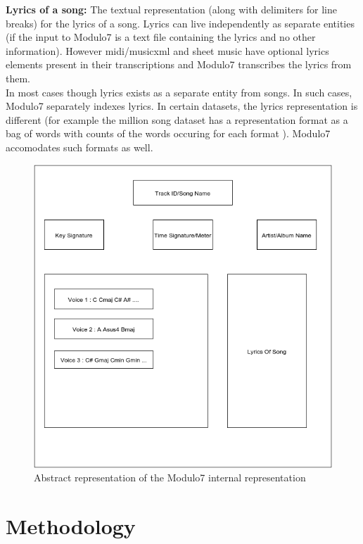 \noindent \textbf{Lyrics of a song:} The textual representation (along with delimiters for line breaks) for the lyrics of a song. Lyrics can live independently as separate entities (if the input to Modulo7 is a text file containing the lyrics and no other information). However midi/musicxml and sheet music have optional lyrics elements present in their transcriptions and Modulo7 transcribes the lyrics from them. \\

\noindent In most cases though lyrics exists as a separate entity from songs. In such cases, Modulo7 separately indexes lyrics. In certain datasets, the lyrics representation is different (for example the million song dataset has a representation format as a bag of words with counts of the words occuring for each format \cite{msd}). Modulo7 accomodates such formats as well.

\begin{figure}
\centering
\includegraphics[width=\textwidth]{DocumentStructureOfModulo7.png}
\makeatletter
\let\@currsize\normalsize
\caption{Abstract representation of the Modulo7 internal representation}
\label{fig:figureDocStruct}
\end{figure}

\newpage

\section{Methodology}

